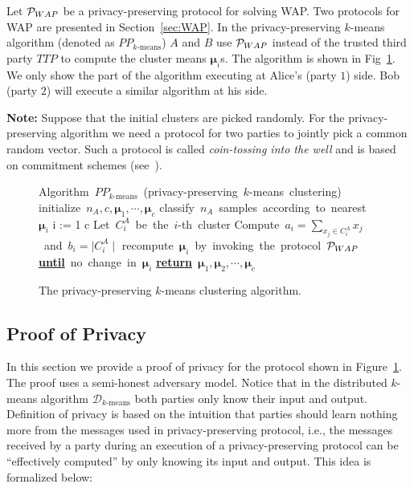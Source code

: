 Let ${\cal P}_{WAP}$ be a privacy-preserving protocol for solving
WAP. Two protocols for WAP are presented in Section~\ref{sec:WAP}.  In
the privacy-preserving $k$-means algorithm (denoted as
$PP_{\mbox{$k$-means}}$) $A$ and $B$ use ${\cal P}_{WAP}$ instead of
the trusted third party $TTP$ to compute the cluster means
$\mathbf{\mu}_i$s.  The algorithm is shown in
Fig~\ref{fig:pp-k-means}. We only show the part of the algorithm
executing at Alice's (party $1$) side. Bob (party $2$) will execute a
similar algorithm at his side.

\noindent
{\bf Note:} Suppose that the initial clusters are picked randomly. For
the privacy-preserving algorithm we need a protocol for two parties to
jointly pick a common random vector. Such a protocol is called {\it
coin-tossing into the well} and is based on commitment schemes
(see~\cite[Section 7.4.3.1]{GoldreichBookVol2}).

\begin{figure}
\begin{center}
\begin{programbox}
\mbox{Algorithm $PP_{\mbox{$k$-means}}$ (privacy-preserving $k$-means clustering)}
\BEGIN \mbox{initialize $n_A ,c,\mathbf{\mu}_1,\cdots,\mathbf{\mu}_c$}
	\DO \mbox{classify $n_A$ samples according to nearest $\mathbf{\mu}_i$}
	    \FOR i := 1 \TO c  \DO
	     \mbox{Let $C_i^A$ be the $i$-th cluster}
	     \mbox{Compute $a_i = \sum_{x_j \in C_i^A } x_j$ and $b_i = \mid C_i^A \mid$}
	     \mbox{recompute $\mathbf{\mu}_i$ by invoking the protocol ${\cal P}_{WAP}$ }
	    \OD
	\mbox{{\bf \underline{until}} no change in $\mathbf{\mu}_i$}
 \mbox{{\bf \underline{return}} $\mathbf{\mu}_1,\mathbf{\mu}_2,\cdots,\mathbf{\mu}_c$}
\END
\end{programbox}
\end{center}
\caption{The privacy-preserving $k$-means clustering algorithm.}
\label{fig:pp-k-means}
\end{figure}

\subsection{Proof of Privacy}

In this section we provide a proof of privacy for the protocol shown
in Figure~\ref{fig:pp-k-means}.  The proof uses a semi-honest
adversary model. Notice that in the distributed $k$-means algorithm
$\mathcal{D}_{\mbox{$k$-means}}$ both parties only know their input
and output.  Definition of privacy is based on the intuition that
parties should learn nothing more from the messages used in
privacy-preserving protocol, i.e., the messages received by a party
during an execution of a privacy-preserving protocol can be
``effectively computed'' by only knowing its input and output. This
idea is formalized below:

